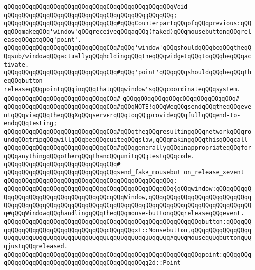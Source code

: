 \verb|qQQqqQQqqQQqqQQqqQQqqQQqqQQqqQQqqQQqqQQqqQQqqQQqVoid|\newline
\verb|qQQqqQQqqQQqqQQqqQQqqQQqqQQqqQQqqQQqqQQqqQQqqQQq;|\newline
\newline
\verb|qQQqqQQqqQQqqQQqqQQqqQQqqQQqqQQq#qQQqCounterpartqQQqofqQQqprevious:qQQqqQQqmakeqQQq'window'qQQqreceiveqQQqaqQQq(faked)qQQqmousebuttonqQQqreleaseqQQqatqQQq'point'.|\newline
\verb|qQQqqQQqqQQqqQQqqQQqqQQqqQQqqQQq#qQQq'window'qQQqshouldqQQqbeqQQqtheqQQqsub/windowqQQqactuallyqQQqholdingqQQqtheqQQqwidgetqQQqtoqQQqbeqQQqactivate.|\newline
\verb|qQQqqQQqqQQqqQQqqQQqqQQqqQQqqQQq#qQQq'point'qQQqqQQqshouldqQQqbeqQQqtheqQQqbutton-releaseqQQqpointqQQqinqQQqthatqQQqwindow'sqQQqcoordinateqQQqsystem.|\newline
\verb|qQQqqQQqqQQqqQQqqQQqqQQqqQQqqQQq#|\newline
\verb|qQQqqQQqqQQqqQQqqQQqqQQqqQQqqQQq#|\newline
\verb|qQQqqQQqqQQqqQQqqQQqqQQqqQQqqQQq#qQQqNOTE!qQQqWeqQQqsendqQQqtheqQQqeventqQQqviaqQQqtheqQQqXqQQqserverqQQqtoqQQqprovideqQQqfullqQQqend-to-endqQQqtesting;|\newline
\verb|qQQqqQQqqQQqqQQqqQQqqQQqqQQqqQQq#qQQqtheqQQqresultingqQQqnetworkqQQqroundqQQqtripqQQqwillqQQqbeqQQqquiteqQQqslow,qQQqmakingqQQqthisqQQqcall|\newline
\verb|qQQqqQQqqQQqqQQqqQQqqQQqqQQqqQQq#qQQqgenerallyqQQqinappropriateqQQqforqQQqanythingqQQqotherqQQqthanqQQqunitqQQqtestqQQqcode.|\newline
\verb|qQQqqQQqqQQqqQQqqQQqqQQqqQQqqQQq#|\newline
\verb|qQQqqQQqqQQqqQQqqQQqqQQqqQQqqQQqsend_fake_mousebutton_release_xevent|\newline
\verb|qQQqqQQqqQQqqQQqqQQqqQQqqQQqqQQqqQQqqQQqqQQqqQQq:|\newline
\verb|qQQqqQQqqQQqqQQqqQQqqQQqqQQqqQQqqQQqqQQqqQQqqQQq{qQQqwindow:qQQqqQQqqQQqqQQqqQQqqQQqqQQqqQQqqQQqqQQqqQQqWindow,qQQqqQQqqQQqqQQqqQQqqQQqqQQqqQQqqQQqqQQqqQQqqQQqqQQqqQQqqQQqqQQqqQQqqQQqqQQqqQQqqQQqqQQqqQQqqQQqqQQq#qQQqWindowqQQqhandlingqQQqtheqQQqmouse-buttonqQQqreleaseqQQqevent.|\newline
\verb|qQQqqQQqqQQqqQQqqQQqqQQqqQQqqQQqqQQqqQQqqQQqqQQqqQQqqQQqbutton:qQQqqQQqqQQqqQQqqQQqqQQqqQQqqQQqqQQqqQQqqQQqxt::Mousebutton,qQQqqQQqqQQqqQQqqQQqqQQqqQQqqQQqqQQqqQQqqQQqqQQqqQQqqQQqqQQqqQQq#qQQqMouseqQQqbuttonqQQqjustqQQqreleased.|\newline
\verb|qQQqqQQqqQQqqQQqqQQqqQQqqQQqqQQqqQQqqQQqqQQqqQQqqQQqqQQqpoint:qQQqqQQqqQQqqQQqqQQqqQQqqQQqqQQqqQQqqQQqqQQqqQQqg2d::Point|\newline
